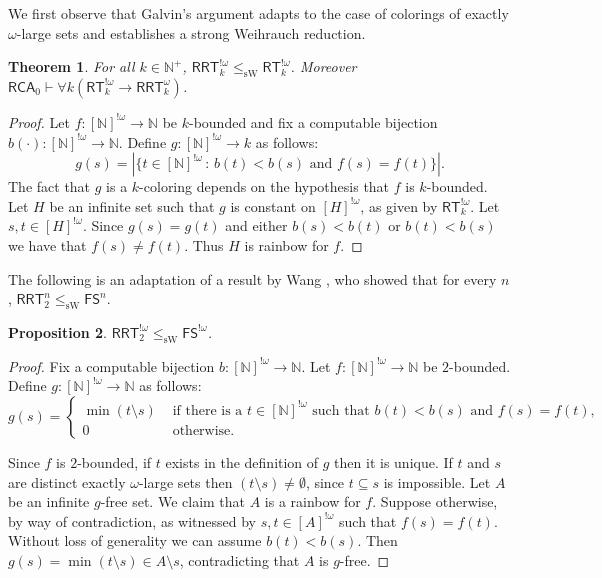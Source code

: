 \documentclass{article}
\newcommand{\RCA}[0]{\mathsf{RCA}}
\newcommand{\RRT}[0]{\mathsf{RRT}}
\newcommand{\FS}[0]{\mathsf{FS}}
\newcommand{\RT}[0]{\mathsf{RT}}
\newcommand{\NN}[0]{\mathbb{N}}
\newcommand{\sW}{\mathrm{sW}}
\newtheorem{theorem}{Theorem}
\numberwithin{theorem}{section}
\newtheorem{proposition}[theorem]{Proposition}
\newcommand{\ludovic}[1]{\textcolor{blue}{#1}}
\newcommand{\quentin}[1]{\textcolor{green}{#1}}
\newcommand{\lorenzo}[1]{\textcolor{orange}{#1}}
\begin{document}
We first observe that Galvin's argument adapts to the case of colorings of exactly $\omega$-large sets and establishes a strong Weihrauch reduction.

\begin{theorem}\label{thm:largerrt}
For all $k\in\NN^+$, $\RRT^{!\omega}_k \leq_\sW \RT^{!\omega}_k$. Moreover $\RCA_0 \vdash \forall k (\RT^{!\omega}_k\to \RRT^{\omega}_k)$.
\end{theorem}

\begin{proof}
Let $f:[\NN]^{!\omega} \to \NN$ be $k$-bounded and fix a computable bijection $b(\cdot): [\NN]^{!\omega} \to \NN$.
Define $g:[\NN]^{!\omega} \to k$ as follows:
$$ g(s) = |\{ t \in [\NN]^{!\omega} \,:\, b(t) < b(s) \text{ and } f(s) = f(t)\}|.$$
The fact that $g$ is a $k$-coloring depends on the hypothesis that $f$ is $k$-bounded.
Let $H$ be an infinite set such that $g$ is constant on $[H]^{!\omega}$, as given by $\RT^{!\omega}_k$. 
Let $s, t \in [H]^{!\omega}$. Since $g(s) = g(t)$ and either $b(s) < b(t)$ or $b(t) < b(s)$
we have that $f(s) \neq f(t)$. Thus $H$ is rainbow for $f$. 
\end{proof}

The following is an adaptation of a result by Wang \cite{wang2014some}, who showed that for every $n$, $\RRT^n_2 \leq_\sW \FS^n$.

\begin{proposition}\label{prop:rrt-omega-2-sw-fs-omega}
$\RRT^{!\omega}_2 \leq_\sW \FS^{!\omega}$.
\end{proposition}

\begin{proof}
Fix a computable bijection $b: [\NN]^{!\omega} \to \NN$. Let $f:[\NN]^{!\omega}\to\NN$
be $2$-bounded. Define $g:[\NN]^{!\omega} \to \NN$ as follows:
$$
g(s)=
\begin{cases}
\min(t\setminus s) & \mbox{ if there is a } t\in [\NN]^{!\omega} \text{ such that } b(t)<b(s) \text{ and } f(s)=f(t),\\
0 & \mbox{ otherwise.}
\end{cases}
$$

Since $f$ is $2$-bounded, if $t$ exists in the definition of $g$ then it is unique. If $t$ and $s$ are distinct
exactly $\omega$-large sets then $(t\setminus s)\neq \emptyset$, since $t\subseteq s$ is impossible. Let $A$ be 
an infinite $g$-free set. We claim that $A$ is a rainbow for $f$. Suppose otherwise, by way of contradiction, 
as witnessed by $s, t \in [A]^{!\omega}$ such that $f(s) = f(t)$. Without loss of generality we can assume
$b(t) < b(s)$. Then $g(s) = \min(t\setminus s) \in A \setminus s$, contradicting that $A$ is $g$-free.
\end{proof}
\end{document}
